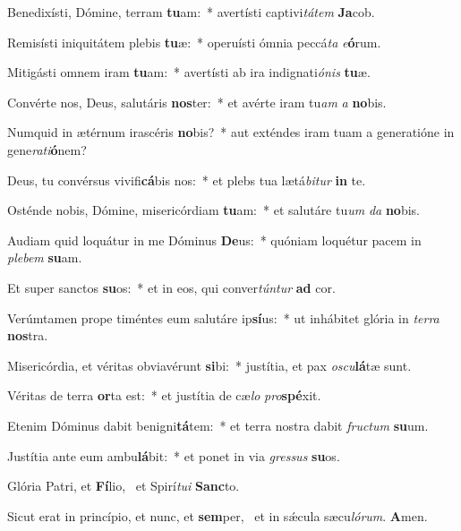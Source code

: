 \item Benedixísti, Dómine, terram \textbf{tu}am:~* avertísti captivi\textit{tá}\textit{tem} \textbf{Ja}cob.
\item Remisísti iniquitátem plebis \textbf{tu}æ:~* operuísti ómnia peccá\textit{ta} \textit{e}\textbf{ó}rum.
\item Mitigásti omnem iram \textbf{tu}am:~* avertísti ab ira indignati\textit{ó}\textit{nis} \textbf{tu}æ.
\item Convérte nos, Deus, salutáris \textbf{nos}ter:~* et avérte iram tu\textit{am} \textit{a} \textbf{no}bis.
\item Numquid in ætérnum irascéris \textbf{no}bis?~* aut exténdes iram tuam a generatióne in gene\textit{ra}\textit{ti}\textbf{ó}nem?
\item Deus, tu convérsus vivifi\textbf{cá}bis nos:~* et plebs tua lætá\textit{bi}\textit{tur} \textbf{in} te.
\item Osténde nobis, Dómine, misericórdiam \textbf{tu}am:~* et salutáre tu\textit{um} \textit{da} \textbf{no}bis.
\item Audiam quid loquátur in me Dóminus \textbf{De}us:~* quóniam loquétur pacem in \textit{ple}\textit{bem} \textbf{su}am.
\item Et super sanctos \textbf{su}os:~* et in eos, qui conver\textit{tún}\textit{tur} \textbf{ad} cor.
\item Verúmtamen prope timéntes eum salutáre ip\textbf{sí}us:~* ut inhábitet glória in \textit{ter}\textit{ra} \textbf{nos}tra.
\item Misericórdia, et véritas obviavérunt \textbf{si}bi:~* justítia, et pax \textit{os}\textit{cu}\textbf{lá}tæ sunt.
\item Véritas de terra \textbf{or}ta est:~* et justítia de cæ\textit{lo} \textit{pro}\textbf{spé}xit.
\item Etenim Dóminus dabit benigni\textbf{tá}tem:~* et terra nostra dabit \textit{fruc}\textit{tum} \textbf{su}um.
\item Justítia ante eum ambu\textbf{lá}bit:~* et ponet in via \textit{gres}\textit{sus} \textbf{su}os.
\item Glória Patri, et \textbf{Fí}lio,~\psstar{} et Spirí\textit{tu}\textit{i} \textbf{Sanc}to.
\item Sicut erat in princípio, et nunc, et \textbf{sem}per,~\psstar{} et in sǽcula sæcu\textit{ló}\textit{rum}. \textbf{A}men.
